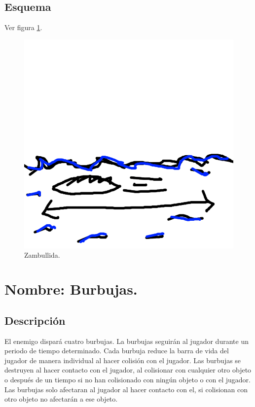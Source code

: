 \subsection{Esquema}
			Ver figura \ref{fig:zambullida}.
			\begin{figure}
				\centering
				\includegraphics[height=0.2 \textheight]{Imagenes/zambullida}
				\caption{Zambullida.}
				\label{fig:zambullida}
			\end{figure}
\section{Nombre: Burbujas.}\label{hab.burbujas}
\subsection{Descripción}
El enemigo dispará cuatro burbujas. La burbujas seguirán al jugador durante un periodo de tiempo determinado. Cada burbuja reduce la barra de vida del jugador de manera individual al hacer colisión con el jugador. Las burbujas se destruyen al hacer contacto con el jugador, al colisionar con cualquier otro objeto o después de un tiempo si no han colisionado con ningún objeto o con el jugador. Las burbujas solo afectaran al jugador al hacer contacto con el, si colisionan con otro objeto no afectarán a ese objeto. 
